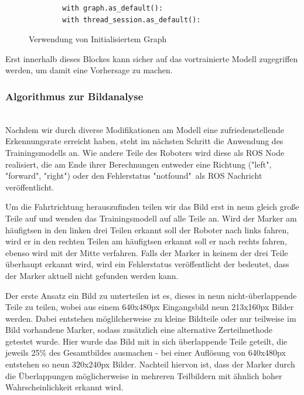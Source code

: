 \documentclass[conference]{IEEEtran}
\begin{document}
	\begin{figure}
		\centering
		\begin{verbatim}
		with graph.as_default():
		with thread_session.as_default():
		\end{verbatim}
		\label{with}
		\caption{Verwendung von Initialisiertem Graph}
	\end{figure}
		
	Erst innerhalb dieses Blockes kann sicher auf das vortrainierte Modell zugegriffen werden, um damit eine Vorhersage zu machen.
	\subsubsection{Algorithmus zur Bildanalyse }
	\noindent \\
Nachdem wir durch diverse Modifikationen am Modell eine zufriedenstellende Erkennungsrate erreicht haben, steht im nächsten Schritt die Anwendung des Trainingsmodells an.
Wie andere Teile des Roboters wird diese als ROS Node realisiert, die am Ende ihrer Berechnungen entweder eine Richtung ("left", "forward", "right") oder den Fehlerstatus "notfound"\ als ROS Nachricht veröffentlicht.

Um die Fahrtrichtung herauszufinden teilen wir das Bild erst in neun gleich gro{\ss}e Teile auf und wenden das Trainingsmodell auf alle Teile an.
Wird der Marker am häufigtsen in den linken drei Teilen erkannt soll der Roboter nach links fahren, wird er in den rechten Teilen am häufigtsen erkannt soll er nach rechts fahren, ebenso wird mit der Mitte verfahren.
Falls der Marker in keinem der drei Teile überhaupt erkannt wird, wird ein Fehlerstatus veröffentlicht der bedeutet, dass der Marker aktuell nicht gefunden werden kann.

Der erste Ansatz ein Bild zu unterteilen ist es, dieses in neun nicht-überlappende Teile zu teilen, wobei aus einem 640x480px Eingangsbild neun 213x160px Bilder werden. 
Dabei entstehen möglilcherweise zu kleine Bildteile oder nur teilweise im Bild vorhandene Marker, sodass zusätzlich eine alternative Zerteilmethode getestet wurde. 
Hier wurde das Bild mit in sich überlappende Teile geteilt, die jeweils 25\% des Gesamtbildes ausmachen - bei einer Auflösung von 640x480px entstehen so neun 320x240px Bilder.
Nachteil hiervon ist, dass der Marker durch die Überlappungen möglicherweise in mehreren Teilbildern mit ähnlich hoher Wahrscheinlichkeit erkannt wird.
\end{document}
